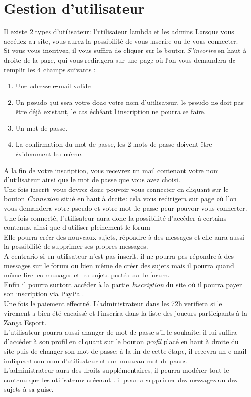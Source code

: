 \documentclass[a4paper, 11pt]{article}
\begin{document}
\section{Gestion d'utilisateur}
Il existe 2 types d'utilisateur: l'utilisateur lambda et les admins
Lorsque vous accédez au site, vous aurez la possibilité de vous inscrire ou de vous connecter.\\
Si vous vous inscrivez, il vous suffira de cliquer sur le bouton \textit{S'inscrire} en haut à droite de la page, qui vous redirigera sur une page où l'on
vous demandera de remplir les 4 champs suivants :
\begin{enumerate}
\item Une adresse e-mail valide
\item Un pseudo qui sera votre donc votre nom d'utilisateur, le pseudo ne doit pas être déjà existant, le cas échéant l'inscription ne pourra se faire.
\item Un mot de passe.
\item La confirmation du mot de passe, les 2 mots de passe doivent être évidemment les même.
\end{enumerate}
A la fin de votre inscription, vous recevrez un mail contenant votre nom d'utilisateur ainsi que le mot de passe que vous avez choisi.\\
Une fois inscrit, vous devrez donc pouvoir vous connecter en cliquant sur le bouton \textit{Connexion} situé en haut à droite: cela vous redirigera sur page où l'on vous demandera votre pseudo et votre mot de passe pour pouvoir vous connecter.\\
Une fois connecté, l'utilisateur aura donc la possibilité d'accéder à certains contenus, ainsi que d'utiliser pleinement le forum.\\
Elle pourra créer des nouveaux sujets, répondre à des messages et elle aura aussi la possibilité de supprimer ses propres messages.\\
A contrario si un utilisateur n'est pas inscrit, il ne pourra pas répondre à des messages sur le forum ou bien même de créer des sujets mais il pourra quand
même lire les messages et les sujets postés sur le forum.\\
Enfin il pourra surtout accéder à la partie \textit{Inscription} du site où il pourra payer son inscription via PayPal.\\
Une fois le paiement effectué. L'administrateur dans les 72h verifiera si le virement a bien été encaissé et l'inscrira dans la liste des joueurs participants à la Zanga Esport.\\
L'utilisateur pourra aussi changer de mot de passe s'il le souhaite: il lui suffira d'accéder à son profil en cliquant sur le bouton \textit{profil} placé en haut à droite du site puis de changer son mot de passe: à la fin de cette étape, il recevra un e-mail indiquant son nom d'utilisateur et son nouveau mot de passe.\\
L'administrateur aura des droits supplémentaires, il pourra modérer tout le contenu que les utilisateurs créeront : il pourra supprimer des messages ou
des sujets à sa guise.
\end{document}
